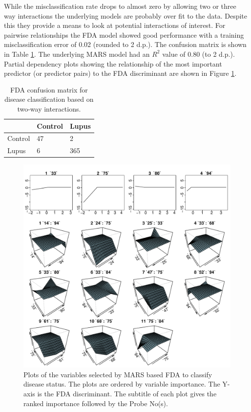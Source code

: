 \documentclass[a4paper, 12pt]{report}
\begin{document}
While the misclassification rate drops to almost zero by allowing two or three way interactions the underlying models are probably over fit to the data. Despite this they provide a means to look at potential interactions of interest. For pairwise relationships the FDA model showed good performance with a training misclassification error of 0.02 (rounded to 2 d.p.). The confusion matrix is  shown in Table \ref{T:confusion1}.  The underlying MARS model had an $R^2$ value of 0.80 (to 2 d.p.). Partial dependency plots showing the relationship of the most important predictor (or predictor pairs) to the FDA discriminant are shown in Figure \ref{F:MARS}. 

\begin{table}[h]
\centering
\begin{tabular}{lll}
  \hline
 & Control & Lupus \\ 
  \hline
Control &  47 &  2 \\ 
  Lupus &   6 & 365 \\ 
   \hline
\end{tabular}
\caption{FDA confusion matrix for disease classification based on two-way interactions.} 
\label{T:confusion1}
\end{table}

\begin{figure}[H]
\begin{center}
\includegraphics[width=\textwidth]{MARS.pdf}
\caption{Plots of the variables selected by MARS based FDA to classify disease status. The plots are ordered by variable importance. The Y-axis is the FDA discriminant. The subtitle of each plot gives the ranked importance followed by the Probe No(s).}
\label{F:MARS}
\end{center}
\end{figure}
\end{document}
